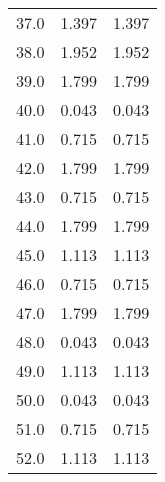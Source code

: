 \begin{table}
\begin{tabular}{ccc}
37.0 & 1.397 & 1.397 \\
38.0 & 1.952 & 1.952 \\
39.0 & 1.799 & 1.799 \\
40.0 & 0.043 & 0.043 \\
41.0 & 0.715 & 0.715 \\
42.0 & 1.799 & 1.799 \\
43.0 & 0.715 & 0.715 \\
44.0 & 1.799 & 1.799 \\
45.0 & 1.113 & 1.113 \\
46.0 & 0.715 & 0.715 \\
47.0 & 1.799 & 1.799 \\
48.0 & 0.043 & 0.043 \\
49.0 & 1.113 & 1.113 \\
50.0 & 0.043 & 0.043 \\
51.0 & 0.715 & 0.715 \\
52.0 & 1.113 & 1.113 \\
\end{tabular}
\end{table}
